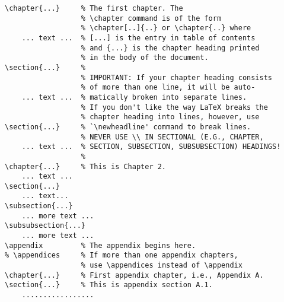 \begin{verbatim}
\chapter{...}     % The first chapter. The
                  % \chapter command is of the form
                  % \chapter[..]{..} or \chapter{..} where
    ... text ...  % [...] is the entry in table of contents
                  % and {...} is the chapter heading printed
                  % in the body of the document.
\section{...}     %
                  % IMPORTANT: If your chapter heading consists
                  % of more than one line, it will be auto-
    ... text ...  % matically broken into separate lines.
                  % If you don't like the way LaTeX breaks the
                  % chapter heading into lines, however, use
\section{...}     % `\newheadline' command to break lines.
                  % NEVER USE \\ IN SECTIONAL (E.G., CHAPTER,
    ... text ...  % SECTION, SUBSECTION, SUBSUBSECTION) HEADINGS!
                  %
\chapter{...}     % This is Chapter 2.
    ... text ...
\section{...}
    ... text...
\subsection{...}
    ... more text ...
\subsubsection{...}
    ... more text ...
\appendix         % The appendix begins here.
% \appendices     % If more than one appendix chapters,
                  % use \appendices instead of \appendix
\chapter{...}     % First appendix chapter, i.e., Appendix A.
\section{...}     % This is appendix section A.1.
    .................
\end{verbatim}
